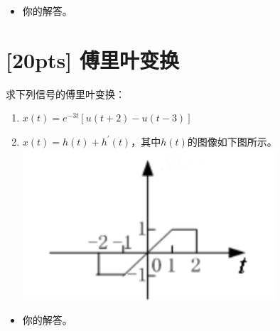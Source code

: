 \documentclass[a4paper,UTF8]{article}
\numberwithin{equation}{section}
\begin{document}
\begin{framed}
\begin{spacing}{1.5}
    \begin{itemize}
    \item 你的解答。
    \end{itemize}
\end{spacing}
\end{framed}


\newpage
\section{[20pts] 傅里叶变换}
求下列信号的傅里叶变换：
\begin{enumerate}[(1)]
	\item $x(t)=e^{-3t}\left[u(t+2)-u(t-3)\right]$
	\item $x(t)=h(t)+h^{\prime}(t)$，其中$h(t)$的图像如下图所示。\\
	\includegraphics[scale=0.4]{2.png}
\end{enumerate}
	
\begin{framed}
\begin{spacing}{1.5}
    \begin{itemize}
        \item 你的解答。
    \end{itemize}
\end{spacing}
\end{framed}


\newpage
\end{document}
